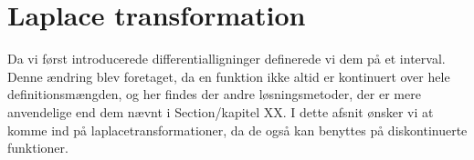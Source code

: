 \section{Laplace transformation}
Da vi først introducerede differentialligninger definerede vi dem på et interval. Denne ændring blev foretaget, da en funktion ikke altid er kontinuert over hele definitionsmængden, og her findes der andre løsningsmetoder, der er mere anvendelige end dem nævnt i Section/kapitel XX. I dette afsnit ønsker vi at komme ind på laplacetransformationer, da de også kan benyttes på diskontinuerte funktioner.










